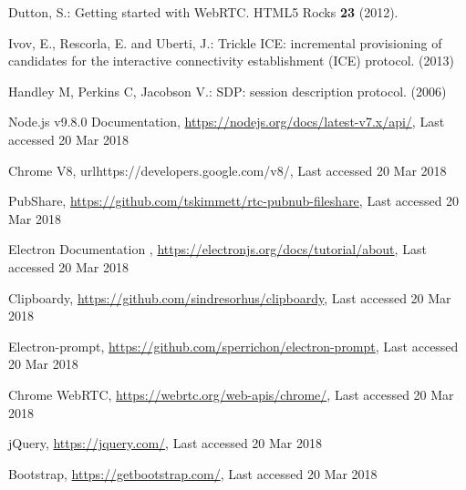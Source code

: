\documentclass[runningheads]{llncs}
\begin{document}
\begin{thebibliography}{8}
Dutton, S.: Getting started with WebRTC. HTML5 Rocks \textbf{23} (2012).

Ivov, E., Rescorla, E. and Uberti, J.: Trickle ICE: incremental provisioning of candidates for the interactive connectivity establishment (ICE) protocol. (2013)

Handley M, Perkins C, Jacobson V.: SDP: session description protocol. (2006)

Node.js v9.8.0 Documentation, \url{https://nodejs.org/docs/latest-v7.x/api/}, Last accessed 20 Mar 2018

Chrome V8, url{https://developers.google.com/v8/}, Last accessed 20 Mar 2018

PubShare, \url{https://github.com/tskimmett/rtc-pubnub-fileshare}, Last accessed 20 Mar 2018

Electron Documentation , \url{https://electronjs.org/docs/tutorial/about}, Last accessed 20 Mar 2018

Clipboardy, \url{https://github.com/sindresorhus/clipboardy}, Last accessed 20 Mar 2018

Electron-prompt, \url{https://github.com/sperrichon/electron-prompt}, Last accessed 20 Mar 2018

Chrome WebRTC, \url{https://webrtc.org/web-apis/chrome/}, Last accessed 20 Mar 2018

jQuery, \url{https://jquery.com/}, Last accessed 20 Mar 2018

Bootstrap, \url{https://getbootstrap.com/}, Last accessed 20 Mar 2018

%
\end{thebibliography}
\end{document}
